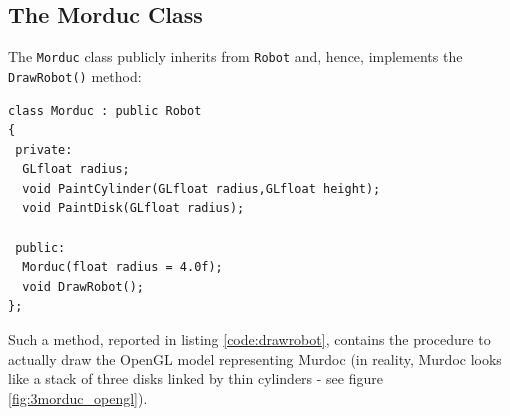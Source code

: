 \subsection{The Morduc Class}
\label{subsec:morducclass}

The \texttt{Morduc} class publicly inherits from \texttt{Robot} 
and, hence, implements the \texttt{DrawRobot()} method:
%
\begin{lstlisting}[caption={\texttt{Morduc} class declaration}, label={code:morducclass}, frame=trBL]
class Morduc : public Robot
{
 private:
  GLfloat radius;
  void PaintCylinder(GLfloat radius,GLfloat height);
  void PaintDisk(GLfloat radius);

 public:
  Morduc(float radius = 4.0f);
  void DrawRobot();
};
\end{lstlisting}
%
Such a method, reported in listing \ref{code:drawrobot}, contains the 
procedure to actually draw the OpenGL model representing Murdoc 
(in reality, Murdoc looks like a stack of three disks linked 
by thin cylinders - see figure \ref{fig:3morduc_opengl}).
%
